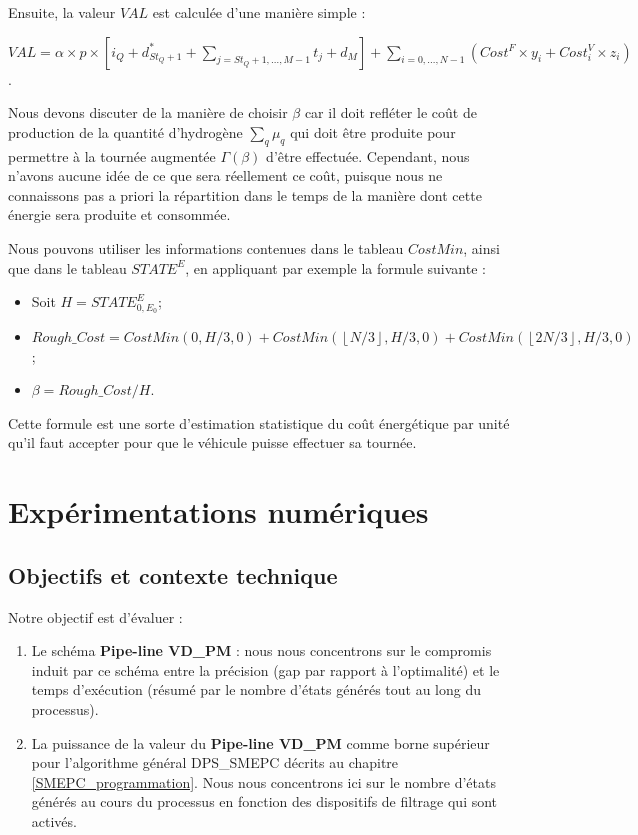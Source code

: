 Ensuite, la valeur $VAL$ est calculée d'une manière simple : 

$VAL=\alpha \times p\times [i_Q + d^*_{St_Q+1}+\sum_{j=St_Q+1, \dots, M-1}t_j + d_M] + \sum_{i = 0, \dots, N -1} (Cost^F\times y_i + Cost^V_i \times z_i)$.


Nous devons discuter de la manière de choisir $\beta$ car il doit refléter le coût de production de la quantité d'hydrogène $\sum_q \mu_q$ qui doit être produite pour permettre à la tournée augmentée $\Gamma(\beta)$ d'être effectuée. 
Cependant, nous n'avons aucune idée de ce que sera réellement ce coût, puisque nous ne connaissons pas a priori la répartition dans le temps de la manière dont cette énergie sera produite et consommée.

Nous pouvons utiliser les informations contenues dans le tableau $CostMin$, ainsi que dans le tableau $STATE^E$, en appliquant par exemple la formule suivante :
\begin{itemize}[label=$\square$]
	
	\item Soit $ H = STATE^E_{0, E_0} $; 
	\item $Rough\_Cost = CostMin(0, H/3 , 0) + CostMin( \left\lfloor N/3\right\rfloor, H/3 , 0) + CostMin(\left\lfloor 2N/3\right\rfloor, H/3 , 0)$ ;
	\item $\beta =Rough\_Cost / H$.
\end{itemize} 
Cette formule est une sorte d'estimation statistique du coût énergétique par unité qu'il faut accepter pour que le véhicule puisse effectuer sa tournée. 


\section{Expérimentations numériques}
\label{Expe_VD_PM}
\subsection{Objectifs et contexte technique}
Notre objectif est d'évaluer :
\begin{enumerate} 
	\item Le schéma \textbf{Pipe-line VD\_PM} : nous nous concentrons sur le compromis induit par ce schéma entre la précision (gap par rapport à l'optimalité) et le temps d'exécution (résumé par le nombre d'états générés tout au long du processus). 
	\item La puissance de la valeur du \textbf{Pipe-line VD\_PM} comme borne supérieur pour l'algorithme général DPS\_SMEPC décrits au chapitre \ref{SMEPC_programmation}. Nous nous concentrons ici sur le nombre d'états générés au cours du processus en fonction des dispositifs de filtrage qui sont activés.
\end{enumerate}

